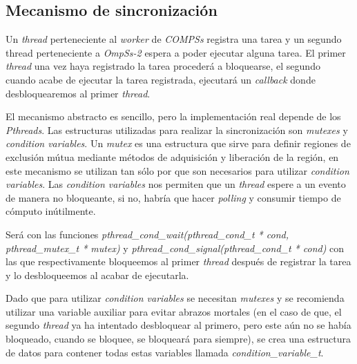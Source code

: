 \begin{comment}
\begin{figure}[H]
    \centering 
    \caption{Mecanismo de sincronización abstracto.}
    \texttt{[image: spawn\_sync.png]}
    \label{fig:spawn\_sync}
\end{figure}
\end{comment}
 
\subsection{Mecanismo de sincronización} 
\label{sec:mecanismosync} 
Un \textit{thread} perteneciente al \textit{worker} de \textit{COMPSs} registra una tarea y un segundo thread perteneciente a \textit{OmpSs-2} espera a poder ejecutar alguna tarea. El primer \textit{thread} una vez haya registrado la tarea procederá a bloquearse, el segundo cuando acabe de ejecutar la tarea registrada, ejecutará un \textit{callback} donde desbloquearemos al primer \textit{thread}. \par\bigskip

El mecanismo abstracto es sencillo, pero la implementación real depende de los \textit{Pthreads}. Las estructuras utilizadas para realizar la sincronización son \textit{mutexes} y \textit{condition variables}. Un \textit{mutex} es una estructura que sirve para definir regiones de exclusión mútua mediante métodos de adquisición y liberación de la región, en este mecanismo se utilizan tan sólo por que son necesarios para utilizar \textit{condition variables}. Las \textit{condition variables} nos permiten que un \textit{thread} espere a un evento de manera no bloqueante, si no, habría que hacer \textit{polling} y consumir tiempo de cómputo inútilmente.
\par\bigskip

Será con las funciones \textit{pthread\_cond\_wait(pthread\_cond\_t * cond, pthread\_mutex\_t * mutex)} y \textit{pthread\_cond\_signal(pthread\_cond\_t * cond)} con las que respectivamente bloqueemos al primer \textit{thread} después de registrar la tarea y lo desbloqueemos al acabar de ejecutarla.
\par\bigskip

Dado que para utilizar \textit{condition variables} se necesitan \textit{mutexes} y se recomienda utilizar una variable auxiliar para evitar abrazos mortales (en el caso de que, el segundo \textit{thread} ya ha intentado desbloquear al primero, pero este aún no se había bloqueado, cuando se bloquee, se bloqueará para siempre), se crea una estructura de datos para contener todas estas variables llamada \textit{condition\_variable\_t}.

